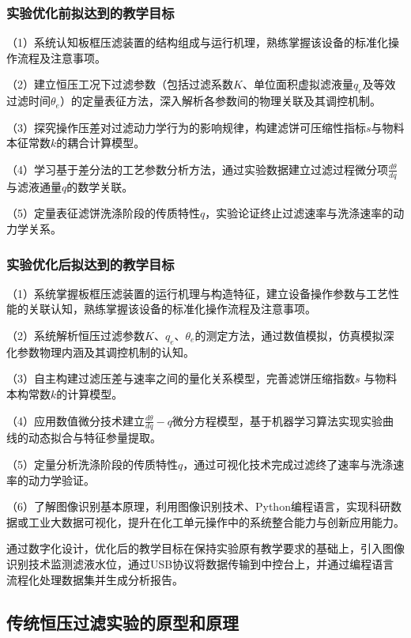 \documentclass[UTF8,a4paper,fontset=none]{ctexart}
\begin{document}
\subsubsection{实验优化前拟达到的教学目标}

（1）系统认知板框压滤装置的结构组成与运行机理，熟练掌握该设备的标准化操作流程及注意事项。

（2）建立恒压工况下过滤参数（包括过滤系数$K$、单位面积虚拟滤液量$q_e$及等效过滤时间$\theta_e$）的定量表征方法，深入解析各参数间的物理关联及其调控机制。

（3）探究操作压差对过滤动力学行为的影响规律，构建滤饼可压缩性指标$s$与物料本征常数$k$的耦合计算模型。

（4）学习基于差分法的工艺参数分析方法，通过实验数据建立过滤过程微分项$\frac{d\theta}{dq}$与滤液通量$q$的数学关联。

（5）定量表征滤饼洗涤阶段的传质特性$q$，实验论证终止过滤速率与洗涤速率的动力学关系。

\subsubsection{实验优化后拟达到的教学目标}

（1）系统掌握板框压滤装置的运行机理与构造特征，建立设备操作参数与工艺性能的关联认知，熟练掌握该设备的标准化操作流程及注意事项。

（2）系统解析恒压过滤参数$K$、$q_e$、$\theta_e$的测定方法，通过数值模拟，仿真模拟深化参数物理内涵及其调控机制的认知。

（3）自主构建过滤压差与速率之间的量化关系模型，完善滤饼压缩指数$s$ 与物料本构常数$k$的计算模型。

（4）应用数值微分技术建立$\frac{d\theta}{dq} - q$微分方程模型，基于机器学习算法实现实验曲线的动态拟合与特征参量提取。

（5）定量分析洗涤阶段的传质特性$q$，通过可视化技术完成过滤终了速率与洗涤速率的动力学验证。

（6）了解图像识别基本原理，利用图像识别技术、Python编程语言，实现科研数据或工业大数据可视化，提升在化工单元操作中的系统整合能力与创新应用能力。

通过数字化设计，优化后的教学目标在保持实验原有教学要求的基础上，引入图像识别技术监测滤液水位，通过USB协议将数据传输到中控台上，并通过编程语言流程化处理数据集并生成分析报告。

\subsection{传统恒压过滤实验的原型和原理}
\end{document}
